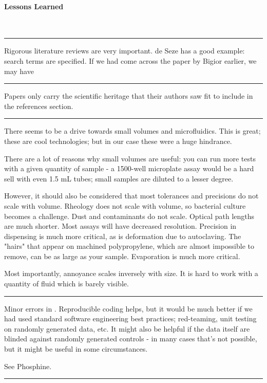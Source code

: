 \documentclass[paper.tex]{subfiles}
\begin{document}
\paragraph{Lessons Learned} \


\rule{\linewidth}{0.2pt}

Rigorous literature reviews are very important. de Seze has a good example: search terms are specified. If we had come across the paper by Bigior earlier, we may have

\rule{\linewidth}{0.2pt}

Papers only carry the scientific heritage that their authors saw fit to include in the references section. 


\rule{\linewidth}{0.2pt}

There seems to be a drive towards small volumes and microfluidics. This is great; these are cool technologies; but in our case these were a huge hindrance.

There are a lot of reasons why small volumes are useful: you can run more tests with a given quantity of sample - a 1500-well microplate assay would be a hard sell with even 1.5 mL tubes; small samples are diluted to a lesser degree. 

However, it should also be considered that most tolerances and precisions do not scale with volume. 
Rheology does not scale with volume, so bacterial culture becomes a challenge. Dust and contaminants do not scale. Optical path lengths are much shorter. Most assays will have decreased resolution. Precision in dispensing is much more critical, as is deformation due to autoclaving. The "hairs" that appear on machined polypropylene, which are almost impossible to remove, can be as large as your sample. Evaporation is much more critical.

Most importantly, annoyance scales inversely with size. It is hard to work with a quantity of fluid which is barely visible.

\rule{\linewidth}{0.2pt}

Minor errors in . Reproducible coding helps, but it would be much better if we had used standard software engineering best practices; red-teaming, unit testing on randomly generated data, etc. It might also be helpful if the data itself are blinded against randomly generated controls - in many cases that's not possible, but it might be useful in some circumstances.

See Phosphine.

\rule{\linewidth}{0.2pt}
\end{document}
